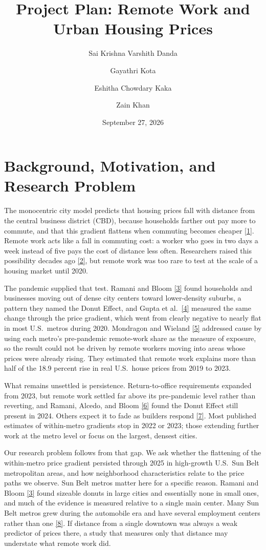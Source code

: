 \documentclass[11pt]{article}
\title{Project Plan: Remote Work and Urban Housing Prices}
\author[1]{Sai Krishna Varshith Danda}
\author[1]{Gayathri Kota}
\author[1]{Eshitha Chowdary Kaka}
\author[1]{Zain Khan}
\affil[1]{Arizona State University, Tempe, AZ 85281, USA}
\date{September 27, 2026}
\newcommand{\refl}[2]{\href{#2}{[#1]}}
\newcommand{\uAlonso}{https://www.hup.harvard.edu/books/9780674537019}
\newcommand{\uMokh}{https://doi.org/10.1068/a36218}
\newcommand{\uRamani}{https://www.nber.org/papers/w28876}
\newcommand{\uGupta}{https://doi.org/10.1016/j.jfineco.2022.06.003}
\newcommand{\uMond}{https://www.nber.org/papers/w30041}
\newcommand{\uPnas}{https://doi.org/10.1073/pnas.2408930121}
\newcommand{\uHoward}{https://doi.org/10.1016/j.jfineco.2023.103705}
\newcommand{\uLeslie}{https://doi.org/10.1177/0160017610365538}
\begin{document}
\maketitle

\section{Background, Motivation, and Research Problem}

The monocentric city model predicts that housing prices fall with distance from
the central business district (CBD), because households farther out pay more to
commute, and that this gradient flattens when commuting becomes cheaper
\refl{1}{\uAlonso}. Remote work acts like a fall in commuting cost: a worker who
goes in two days a week instead of five pays the cost of distance less often.
Researchers raised this possibility decades ago \refl{2}{\uMokh}, but remote work
was too rare to test at the scale of a housing market until 2020.

The pandemic supplied that test. Ramani and Bloom \refl{3}{\uRamani} found
households and businesses moving out of dense city centers toward lower-density
suburbs, a pattern they named the Donut Effect, and Gupta et al.\
\refl{4}{\uGupta} measured the same change through the price gradient, which went
from clearly negative to nearly flat in most U.S.\ metros during 2020. Mondragon
and Wieland \refl{5}{\uMond} addressed cause by using each metro's pre-pandemic
remote-work share as the measure of exposure, so the result could not be driven
by remote workers moving into areas whose prices were already rising. They
estimated that remote work explains more than half of the 18.9 percent rise in
real U.S.\ house prices from 2019 to 2023.

What remains unsettled is persistence. Return-to-office requirements expanded
from 2023, but remote work settled far above its pre-pandemic level rather than
reverting, and Ramani, Alcedo, and Bloom \refl{6}{\uPnas} found the Donut Effect
still present in 2024. Others expect it to fade as builders respond
\refl{7}{\uHoward}. Most published estimates of within-metro gradients stop in
2022 or 2023; those extending further work at the metro level or focus on the
largest, densest cities.

Our research problem follows from that gap. We ask whether the flattening of the
within-metro price gradient persisted through 2025 in high-growth U.S.\ Sun Belt
metropolitan areas, and how neighborhood characteristics relate to the price
paths we observe. Sun Belt metros matter here for a specific reason. Ramani and
Bloom \refl{3}{\uRamani} found sizeable donuts in large cities and essentially
none in small ones, and much of the evidence is measured relative to a single
main center. Many Sun Belt metros grew during the automobile era and have
several employment centers rather than one \refl{8}{\uLeslie}. If distance from
a single downtown was always a weak predictor of prices there, a study that
measures only that distance may understate what remote work did.
\end{document}
